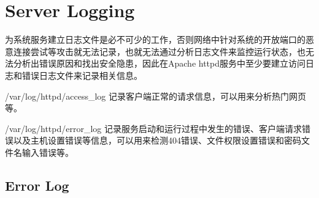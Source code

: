 \begin{lstlisting}[language=bash]

\end{lstlisting}




\begin{lstlisting}[language=bash]

\end{lstlisting}




\begin{lstlisting}[language=bash]

\end{lstlisting}




\begin{lstlisting}[language=bash]

\end{lstlisting}




\begin{lstlisting}[language=bash]

\end{lstlisting}




\begin{lstlisting}[language=bash]

\end{lstlisting}




\section{Server Logging}

为系统服务建立日志文件是必不可少的工作，否则网络中针对系统的开放端口的恶意连接尝试等攻击就无法记录，也就无法通过分析日志文件来监控运行状态，也无法分析出错误原因和找出安全隐患，因此在Apache httpd服务中至少要建立访问日志和错误日志文件来记录相关信息。

\begin{compactitem}
\item /var/log/httpd/access_log 记录客户端正常的请求信息，可以用来分析热门网页等。
\item /var/log/httpd/error_log 记录服务启动和运行过程中发生的错误、客户端请求错误以及主机设置错误等信息，可以用来检测404错误、文件权限设置错误和密码文件名输入错误等。
\end{compactitem}

\subsection{Error Log}


